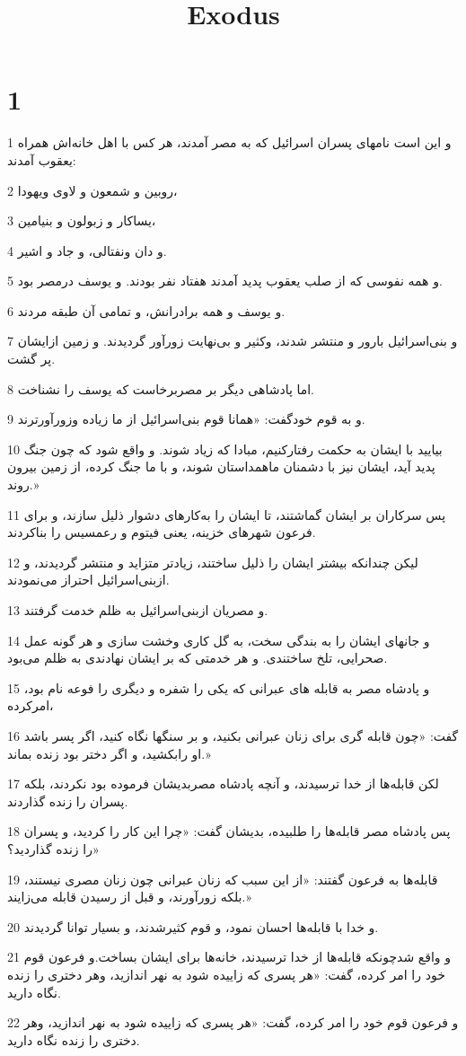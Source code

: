 

\title{Exodus}

 
\chapter{1}

\par 1 و این است نامهای پسران اسرائیل که به مصر آمدند، هر کس با اهل خانه‌اش همراه یعقوب آمدند:
\par 2 روبین و شمعون و لاوی ویهودا،
\par 3 یساکار و زبولون و بنیامین،
\par 4 و دان ونفتالی، و جاد و اشیر.
\par 5 و همه نفوسی که از صلب یعقوب پدید آمدند هفتاد نفر بودند. و یوسف درمصر بود.
\par 6 و یوسف و همه برادرانش، و تمامی آن طبقه مردند.
\par 7 و بنی‌اسرائیل بارور و منتشر شدند، وکثیر و بی‌نهایت زورآور گردیدند. و زمین ازایشان پر گشت.
\par 8 اما پادشاهی دیگر بر مصربرخاست که یوسف را نشناخت.
\par 9 و به قوم خودگفت: «همانا قوم بنی‌اسرائیل از ما زیاده وزورآورترند.
\par 10 بیایید با ایشان به حکمت رفتارکنیم، مبادا که زیاد شوند. و واقع شود که چون جنگ پدید آید، ایشان نیز با دشمنان ماهمداستان شوند، و با ما جنگ کرده، از زمین بیرون روند.»
\par 11 پس سرکاران بر ایشان گماشتند، تا ایشان را به‌کارهای دشوار ذلیل سازند، و برای فرعون شهرهای خزینه، یعنی فیتوم و رعمسیس را بناکردند.
\par 12 لیکن چندانکه بیشتر ایشان را ذلیل ساختند، زیادتر متزاید و منتشر گردیدند، و ازبنی‌اسرائیل احتراز می‌نمودند.
\par 13 و مصریان ازبنی‌اسرائیل به ظلم خدمت گرفتند.
\par 14 و جانهای ایشان را به بندگی سخت، به گل کاری وخشت سازی و هر گونه عمل صحرایی، تلخ ساختندی. و هر خدمتی که بر ایشان نهادندی به ظلم می‌بود.
\par 15 و پادشاه مصر به قابله های عبرانی که یکی را شفره و دیگری را فوعه نام بود، امرکرده،
\par 16 گفت: «چون قابله گری برای زنان عبرانی بکنید، و بر سنگها نگاه کنید، اگر پسر باشد او رابکشید، و اگر دختر بود زنده بماند.»
\par 17 لکن قابله‌ها از خدا ترسیدند، و آنچه پادشاه مصربدیشان فرموده بود نکردند، بلکه پسران را زنده گذاردند.
\par 18 پس پادشاه مصر قابله‌ها را طلبیده، بدیشان گفت: «چرا این کار را کردید، و پسران را زنده گذاردید؟»
\par 19 قابله‌ها به فرعون گفتند: «از این سبب که زنان عبرانی چون زنان مصری نیستند، بلکه زورآورند، و قبل از رسیدن قابله می‌زایند.»
\par 20 و خدا با قابله‌ها احسان نمود، و قوم کثیرشدند، و بسیار توانا گردیدند.
\par 21 و واقع شدچونکه قابله‌ها از خدا ترسیدند، خانه‌ها برای ایشان بساخت.و فرعون قوم خود را امر کرده، گفت: «هر پسری که زاییده شود به نهر اندازید، وهر دختری را زنده نگاه دارید.
\par 22 و فرعون قوم خود را امر کرده، گفت: «هر پسری که زاییده شود به نهر اندازید، وهر دختری را زنده نگاه دارید.
 
